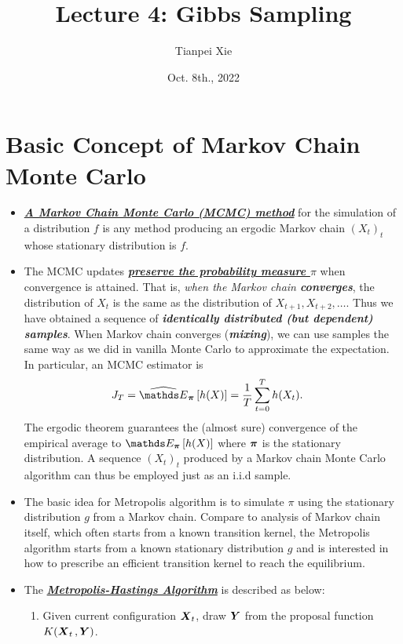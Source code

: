 \documentclass[11pt]{article}
\begin{document}
\title{Lecture 4: Gibbs Sampling}
\author{ Tianpei Xie}
\date{Oct. 8th., 2022}
\maketitle
\tableofcontents
\newpage
\allowdisplaybreaks
\section{Basic Concept of Markov Chain Monte Carlo}
\begin{itemize}
\item \begin{definition}
\underline{\emph{\textbf{A Markov Chain Monte Carlo (MCMC) method}}} for the simulation of a distribution $f$ is any method producing an ergodic Markov chain $(X_t)_t$ whose stationary distribution is $f$.
\end{definition}

\item The MCMC updates \underline{\emph{\textbf{preserve the probability measure $\pi$}}} when convergence is attained. That is, \emph{when the Markov chain \textbf{converges}}, the distribution of $X_t$ is the same as the distribution of $X_{t+1}, X_{t+2}, \ldots$. Thus we have obtained a sequence of \emph{\textbf{identically distributed (but dependent) samples}}. When Markov chain converges (\emph{\textbf{mixing}}), we can use samples the same way as we did in vanilla Monte Carlo to approximate the expectation. In particular, an MCMC estimator is
\begin{align}
J_{T} &= \Em{\mb{\pi}}{h(X)} = \frac{1}{T}\sum_{t=0}^{T}h(X_t). \label{eqn: mcmc_estimator}
\end{align} The ergodic theorem guarantees the (almost sure) convergence of the empirical average  to $\E{\mb{\pi}}{h(X)}$ where $\boldsymbol{\pi}$ is the stationary distribution. A sequence $(X_t)_t$ produced by a Markov chain Monte Carlo algorithm can thus be employed just as an i.i.d sample.

\item The basic idea for Metropolis algorithm is to simulate $\pi$ using the stationary distribution $g$ from a Markov chain. Compare to analysis of Markov chain itself, which often starts from a known transition kernel, the Metropolis algorithm starts from a known stationary distribution $g$ and is interested in how to prescribe an efficient transition kernel to reach the equilibrium.

\item The \underline{\emph{\textbf{Metropolis-Hastings Algorithm}}} \citep{robert1999monte, liu2001monte} is described as below:
\begin{enumerate}
\item Given current configuration $\boldsymbol{X}_{t}$, draw $\boldsymbol{Y}$ from the proposal function $K(\boldsymbol{X}_{t}\,, \boldsymbol{Y})$.


\end{enumerate}
\end{itemize}
\end{document}

